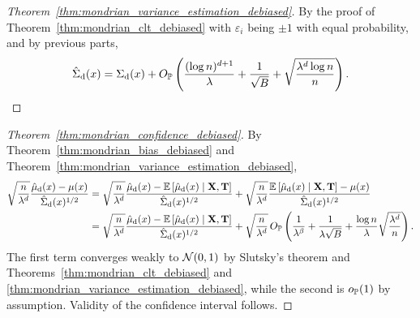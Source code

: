 \begin{proof}[Theorem~\ref{thm:mondrian_variance_estimation_debiased}]

  By the proof of Theorem~\ref{thm:mondrian_clt_debiased}
  with $\varepsilon_i$ being $\pm 1$ with equal probability,
  and by previous parts,
  \begin{align*}
    \hat\Sigma_\rd(x)
    = \Sigma_\rd(x)
    + O_\P \left(
      \frac{(\log n)^{d+1}}{\lambda}
      + \frac{1}{\sqrt B}
      + \sqrt{\frac{\lambda^d \log n}{n}}
    \right).
  \end{align*}

\end{proof}

\begin{proof}[Theorem~\ref{thm:mondrian_confidence_debiased}]
  By Theorem~\ref{thm:mondrian_bias_debiased}
  and Theorem~\ref{thm:mondrian_variance_estimation_debiased},
  \begin{align*}
    \sqrt{\frac{n}{\lambda^d}}
    \frac{\hat \mu_\rd(x) - \mu(x)}{\hat \Sigma_\rd(x)^{1/2}}
    &=
    \sqrt{\frac{n}{\lambda^d}}
    \frac{\hat \mu_\rd(x) - \E \left[ \hat \mu_\rd(x) \mid \bX, \bT \right]}
    {\hat \Sigma_\rd(x)^{1/2}}
    + \sqrt{\frac{n}{\lambda^d}}
    \frac{\E \left[ \hat \mu_\rd(x) \mid \bX, \bT \right] - \mu(x)}
    {\hat \Sigma_\rd(x)^{1/2}} \\
    &=
    \sqrt{\frac{n}{\lambda^d}}
    \frac{\hat \mu_\rd(x) - \E \left[ \hat \mu_\rd(x) \mid \bX, \bT \right]}
    {\hat \Sigma_\rd(x)^{1/2}}
    + \sqrt{\frac{n}{\lambda^d}} \,
    O_\P \left(
      \frac{1}{\lambda^\beta}
      + \frac{1}{\lambda \sqrt B}
      + \frac{\log n}{\lambda} \sqrt{\frac{\lambda^d}{n}}
    \right).
  \end{align*}
  The first term converges weakly to $\cN(0,1)$ by
  Slutsky's theorem and Theorems~\ref{thm:mondrian_clt_debiased}
  and \ref{thm:mondrian_variance_estimation_debiased},
  while the second is $o_\P(1)$ by assumption.
  Validity of the confidence interval follows.
\end{proof}

